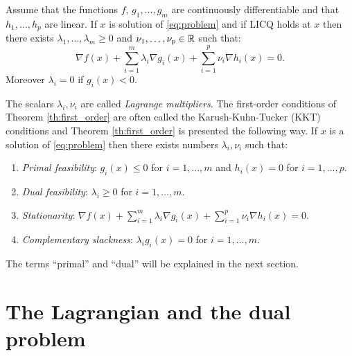 \documentclass[11pt,nocut]{article}
\begin{document}
\begin{theorem}\label{th:first_order}
	Assume that the functions $f$, $g_1, \dots, g_m$ are continuously differentiable and that $h_1, \dots, h_p$ are linear. If $x$ is solution of \eqref{eq:problem} and if LICQ holds at $x$
	then there exists $\lambda_1, \dots, \lambda_m \geq 0$ and $\nu_1, \dots, \nu_p \in \mathbb{R}$ such that:
	\begin{equation}\label{eq:kkt}
		\nabla f(x) + \sum_{i=1}^m \lambda_i \nabla g_i(x) + \sum_{i=1}^p \nu_i \nabla h_i(x) = 0.
	\end{equation}
	Moreover $\lambda_i = 0$ if $g_i(x) < 0$.
\end{theorem}

The scalars $\lambda_i, \nu_i$ are called \emph{Lagrange multipliers}.
The first-order conditions of Theorem \ref{th:first_order} are often called the Karush-Kuhn-Tucker (KKT) conditions and Theorem \ref{th:first_order} is presented the following way.
If $x$ is a solution of \eqref{eq:problem} then there exists numbers $\lambda_i,\nu_i$ such that:
\begin{enumerate}[label=(\roman*)]
	\item\label{item:kkt1} \emph{Primal feasibility}: $g_i(x) \leq 0$ for $i=1, \dots, m$ and $h_i(x) = 0$ for $i=1, \dots, p$.
	\item\label{item:kkt2} \emph{Dual feasibility}: $\lambda_i \geq 0$ for $i=1, \dots, m$.
	\item\label{item:kkt3} \emph{Stationarity}: $\nabla f(x) + \sum\limits_{i=1}^m \lambda_i \nabla g_i(x) + \sum\limits_{i=1}^p \nu_i \nabla h_i(x) = 0$.
	\item\label{item:kkt4} \emph{Complementary slackness}: $\lambda_i g_i(x) = 0$ for $i = 1 ,\dots, m$.
\end{enumerate}
The terms ``primal'' and ``dual'' will be explained in the next section.

\section{The Lagrangian and the dual problem}
\end{document}
